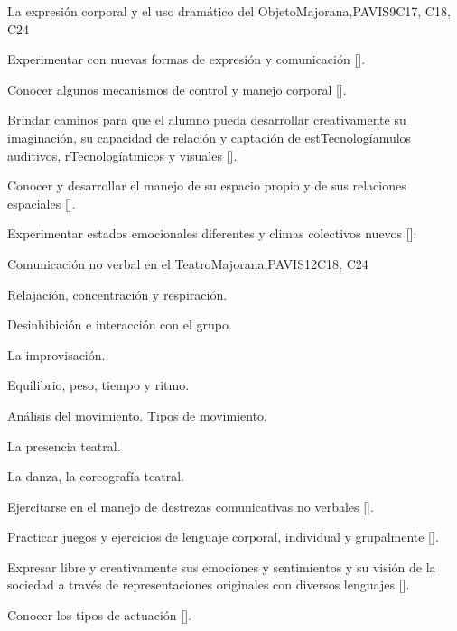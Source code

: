 \begin{syllabus}
\begin{unit}{}{La expresión corporal y el uso dramático del Objeto}{Majorana,PAVIS}{9}{C17, C18, C24}
\begin{topics}
\end{topics}
\begin{learningoutcomes}
	\item Experimentar con nuevas formas de expresión y comunicación [\Usage].
	\item Conocer algunos mecanismos de control y manejo corporal [\Usage].
	\item Brindar caminos para que el alumno pueda desarrollar creativamente su imaginación, su capacidad de relación  y captación de estTecnologíamulos auditivos, rTecnologíatmicos y visuales [\Usage].
	\item Conocer y desarrollar el manejo de su espacio propio  y de sus  relaciones  espaciales  [\Usage].
	\item Experimentar  estados emocionales diferentes y climas  colectivos nuevos [\Usage].
\end{learningoutcomes}
\end{unit}

\begin{unit}{}{Comunicación no verbal en el Teatro}{Majorana,PAVIS}{12}{C18, C24}
\begin{topics}
	\item Relajación, concentración y respiración.
	\item Desinhibición e interacción con el grupo.
	\item La improvisación.
	\item Equilibrio, peso, tiempo y ritmo.
	\item Análisis del movimiento. Tipos de movimiento.
	\item La presencia teatral.
	\item La danza, la coreografía teatral.

\end{topics}
\begin{learningoutcomes}
	\item Ejercitarse en el manejo de destrezas comunicativas no verbales [\Usage].
	\item Practicar juegos y ejercicios de lenguaje  corporal, individual y grupalmente [\Usage].
	\item Expresar libre y creativamente sus emociones y sentimientos y su visión de la sociedad  a través de representaciones originales con diversos lenguajes [\Usage].
	\item Conocer los tipos de actuación [\Usage].
\end{learningoutcomes}
\end{unit}


\end{syllabus}

